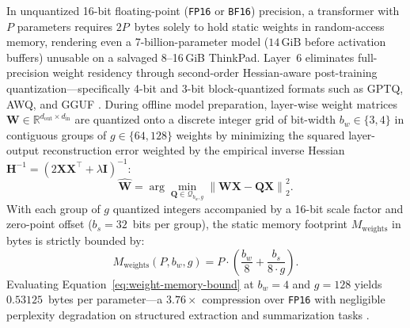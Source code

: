 In unquantized 16-bit floating-point (\texttt{FP16} or \texttt{BF16}) precision, a transformer with $P$ parameters requires $2P$~bytes solely to hold static weights in random-access memory, rendering even a 7-billion-parameter model ($14\,\mathrm{GiB}$ before activation buffers) unusable on a salvaged 8--16\,\textrm{GiB} ThinkPad. Layer~6 eliminates full-precision weight residency through second-order Hessian-aware post-training quantization---specifically 4-bit and 3-bit block-quantized formats such as GPTQ, AWQ, and GGUF \parencite{frantar2023gptq}. During offline model preparation, layer-wise weight matrices $\mathbf{W} \in \mathbb{R}^{d_{\mathrm{out}} \times d_{\mathrm{in}}}$ are quantized onto a discrete integer grid of bit-width $b_w \in \{3, 4\}$ in contiguous groups of $g \in \{64, 128\}$ weights by minimizing the squared layer-output reconstruction error weighted by the empirical inverse Hessian $\mathbf{H}^{-1} = (2 \mathbf{X}\mathbf{X}^\top + \lambda \mathbf{I})^{-1}$:
\begin{equation}
\widehat{\mathbf{W}} = \arg\min_{\mathbf{Q} \in \mathcal{Q}_{b_w, g}} \left\| \mathbf{W}\mathbf{X} - \mathbf{Q}\mathbf{X} \right\|_2^2.
\label{eq:gptq-objective}
\end{equation}
With each group of $g$ quantized integers accompanied by a 16-bit scale factor and zero-point offset ($b_s = 32$~bits per group), the static memory footprint $M_{\mathrm{weights}}$ in bytes is strictly bounded by:
\begin{equation}
M_{\mathrm{weights}}(P, b_w, g) = P \cdot \left( \frac{b_w}{8} + \frac{b_s}{8 \cdot g} \right).
\label{eq:weight-memory-bound}
\end{equation}
Evaluating Equation~\eqref{eq:weight-memory-bound} at $b_w = 4$ and $g = 128$ yields $0.53125$~bytes per parameter---a $3.76\times$ compression over \texttt{FP16} with negligible perplexity degradation on structured extraction and summarization tasks \parencite{frantar2023gptq}.

